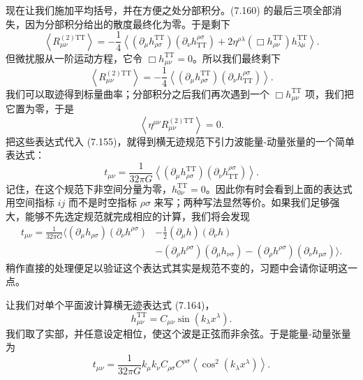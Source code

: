 现在让我们施加平均括号，并在方便之处分部积分。(7.160) 的最后三项全部消失，因为分部积分给出的散度最终化为零。于是剩下
\begin{equation*}
\left\langle R^{(2)\mathrm{TT}}_{\mu\nu}\right\rangle = -\frac{1}{4}\left\langle(\partial_\mu h^{\mathrm{TT}}_{\rho\sigma})(\partial_\nu h^{\rho\sigma}_{\mathrm{TT}}) + 2\eta^{\rho\lambda}(\Box h^{\mathrm{TT}}_{\rho\nu})h^{\mathrm{TT}}_{\lambda\mu}\right\rangle.
\tag{7.161}
\end{equation*}
但微扰服从一阶运动方程，它令 $\Box h^{\mathrm{TT}}_{\mu\nu} = 0$。所以我们最终剩下
\begin{equation*}
\left\langle R^{(2)\mathrm{TT}}_{\mu\nu}\right\rangle = -\frac{1}{4}\left\langle(\partial_\mu h^{\mathrm{TT}}_{\rho\sigma})(\partial_\nu h^{\rho\sigma}_{\mathrm{TT}})\right\rangle.
\tag{7.162}
\end{equation*}
我们可以取迹得到标量曲率；分部积分之后我们再次遇到一个 $\Box h^{\mathrm{TT}}_{\mu\nu}$ 项，我们把它置为零，于是
\begin{equation*}
\left\langle\eta^{\mu\nu}R^{(2)\mathrm{TT}}_{\mu\nu}\right\rangle = 0.
\tag{7.163}
\end{equation*}
把这些表达式代入 (7.155)，就得到横无迹规范下引力波能量-动量张量的一个简单表达式：
\begin{equation*}
\boxed{\,t_{\mu\nu} = \frac{1}{32\pi G}\left\langle(\partial_\mu h^{\mathrm{TT}}_{\rho\sigma})(\partial_\nu h^{\rho\sigma}_{\mathrm{TT}})\right\rangle.\,}
\tag{7.164}
\end{equation*}
记住，在这个规范下非空间分量为零，$h^{\mathrm{TT}}_{0\nu} = 0$。因此你有时会看到上面的表达式用空间指标 $ij$ 而不是时空指标 $\rho\sigma$ 来写；两种写法显然等价。如果我们足够强大，能够不先选定规范就完成相应的计算，我们将会发现
\begin{align*}
t_{\mu\nu} = \frac{1}{32\pi G}\Big\langle(\partial_\mu h_{\rho\sigma})(\partial_\nu h^{\rho\sigma}) &- \frac{1}{2}(\partial_\mu h)(\partial_\nu h) \\
&- (\partial_\rho h^{\rho\sigma})(\partial_\mu h_{\nu\sigma}) - (\partial_\rho h^{\rho\sigma})(\partial_\nu h_{\mu\sigma})\Big\rangle.
\tag{7.165}
\end{align*}
稍作直接的处理便足以验证这个表达式其实是规范不变的，习题中会请你证明这一点。

让我们对单个平面波计算横无迹表达式 (7.164)，
\begin{equation*}
h^{\mathrm{TT}}_{\mu\nu} = C_{\mu\nu}\sin(k_\lambda x^\lambda).
\tag{7.166}
\end{equation*}
我们取了实部，并任意设定相位，使这个波是正弦而非余弦。于是能量-动量张量为
\begin{equation*}
t_{\mu\nu} = \frac{1}{32\pi G}k_\mu k_\nu C_{\rho\sigma}C^{\rho\sigma}\left\langle\cos^{2}(k_\lambda x^\lambda)\right\rangle.
\tag{7.167}
\end{equation*}

